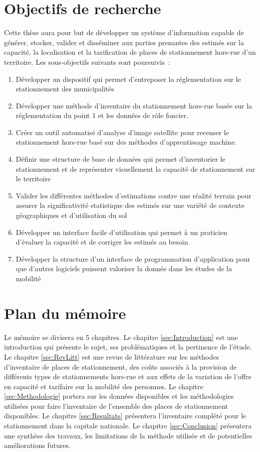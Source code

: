\section{Objectifs de recherche}  \label{sec:obj_recherche}%
Cette thèse aura pour but de développer un système d'information capable de générer, stocker, valider et disséminer aux parties prenantes des estimés sur la capacité, la localisation et la tarification de places de stationnement hors-rue d'un territoire. Les sous-objectifs suivants sont poursuivis :

\begin{enumerate}
\item Développer un dispositif qui permet d'entreposer la réglementation sur le stationnement des municipalités 
\item Développer une méthode d'inventaire du stationnement hors-rue basée sur la réglementation du point 1 et les données de rôle foncier.
\item Créer un outil automatisé d'analyse d'image satellite pour recenser le stationnement hors-rue basé sur des méthodes d'apprentissage machine.
\item Définir une structure de base de données qui permet d'inventorier le stationnement et de représenter visuellement la capacité de stationnement sur le territoire
\item Valider les différentes méthodes d'estimations contre une réalité terrain pour assurer la significativité statistique des estimés sur une variété de contexte géographiques et d'utilisation du sol
\item Développer un interface facile d'utilisation qui permet à un praticien d'évaluer la capacité et de corriger les estimés au besoin
\item Développer la structure d'un interface de programmation d'application pour que d'autres logiciels puissent valoriser la donnée dans les études de la mobilité
\end{enumerate}

\section{Plan du mémoire}  %

Le mémoire se divisera en 5 chapitres. Le chapitre \ref{sec:Introduction} est une introduction qui présente le sujet, ses problématiques et la pertinence de l'étude. Le chapitre \ref{sec:RevLitt} est une revue de littérature sur les méthodes d'inventaire de places de stationnement, des coûts associés à la provision de différents types de stationnements hors-rue et aux effets de la variation de l'offre en capacité et tarifaire sur la mobilité des personnes. Le chapitre \ref{sec:Methodologie} portera sur les données disponibles et les méthodologies utilisées pour faire l'inventaire de l'ensemble des places de stationnement disponibles. Le chapitre \ref{sec:Resultats} présentera l'inventaire complété pour le stationnement dans la capitale nationale. Le chapitre \ref{sec:Conclusion} présentera une synthèse des travaux, les limitations de la méthode utilisée et de potentielles améliorations futures.

\clearpage

